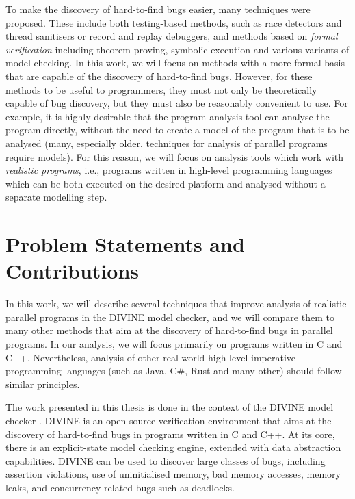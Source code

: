 To make the discovery of hard-to-find bugs easier, many techniques were proposed.
These include both testing-based methods, such as race detectors and thread sanitisers or record and replay debuggers, and methods based on \emph{formal verification} including theorem proving, symbolic execution and various variants of model checking.
In this work, we will focus on methods with a more formal basis that are capable of the discovery of hard-to-find bugs.
However, for these methods to be useful to programmers, they must not only be theoretically capable of bug discovery, but they must also be reasonably convenient to use.
For example, it is highly desirable that the program analysis tool can analyse the program directly, without the need to create a model of the program that is to be analysed (many, especially older, techniques for analysis of parallel programs require models).
For this reason, we will focus on analysis tools which work with \emph{realistic programs}, i.e., programs written in high-level programming languages which can be both executed on the desired platform and analysed without a separate modelling step.

\section{Problem Statements and Contributions}

In this work, we will describe several techniques that improve analysis of realistic parallel programs in the DIVINE model checker, and we will compare them to many other methods that aim at the discovery of hard-to-find bugs in parallel programs.
In our analysis, we will focus primarily on programs written in C and C++.
Nevertheless, analysis of other real-world high-level imperative programming
languages (such as Java, C\#, Rust and many other) should follow similar
principles.

The work presented in this thesis is done in the context of the DIVINE model checker .
DIVINE is an open-source verification environment that aims at the discovery of hard-to-find bugs in programs written in C and C++.
At its core, there is an explicit-state model checking engine, extended with data abstraction capabilities.
DIVINE can be used to discover large classes of bugs, including assertion violations, use of uninitialised memory, bad memory accesses, memory leaks, and concurrency related bugs such as deadlocks.

